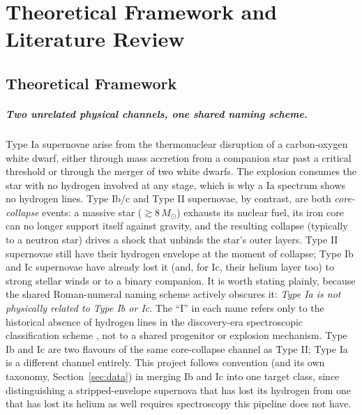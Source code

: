 \chapter{Theoretical Framework and Literature Review}

\section{Theoretical Framework}
\label{sec:theory}

\paragraph{Two unrelated physical channels, one shared naming scheme.}
Type Ia supernovae arise from the thermonuclear disruption of a carbon-oxygen
white dwarf, either through mass accretion from a companion star past a
critical threshold or through the merger of two white dwarfs. The explosion
consumes the star with no hydrogen involved at any stage, which is why a Ia
spectrum shows no hydrogen lines. Type Ib/c and Type II supernovae, by
contrast, are both \emph{core-collapse} events: a massive star ($\gtrsim
8\,M_\odot$) exhausts its nuclear fuel, its iron core can no longer support
itself against gravity, and the resulting collapse (typically to a neutron
star) drives a shock that unbinds the star's outer layers. Type II
supernovae still have their hydrogen envelope at the moment of collapse;
Type Ib and Ic supernovae have already lost it (and, for Ic, their helium
layer too) to strong stellar winds or to a binary companion. It is worth
stating plainly, because the shared Roman-numeral naming scheme actively
obscures it: \emph{Type Ia is not physically related to Type Ib or Ic}. The
``I'' in each name refers only to the historical absence of hydrogen lines
in the discovery-era spectroscopic classification scheme
\citep{filippenko1997}, not to a shared progenitor or explosion mechanism.
Type Ib and Ic are two flavours of the same core-collapse channel as Type
II; Type Ia is a different channel entirely. This project follows
convention (and its own taxonomy, Section~\ref{sec:data}) in merging Ib and
Ic into one target class, since distinguishing a stripped-envelope
supernova that has lost its hydrogen from one that has lost its helium as
well requires spectroscopy this pipeline does not have.

